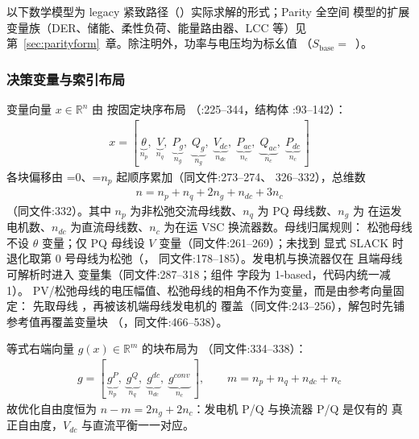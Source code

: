以下数学模型为 legacy 紧致路径（）实际求解的形式；Parity 全空间
模型的扩展变量族（DER、储能、柔性负荷、能量路由器、LCC 等）见
第~\ref{sec:parityform}~章。除注明外，功率与电压均为标幺值
（$S_{\mathrm{base}}=$~）。

\subsubsection*{决策变量与索引布局}
变量向量 $x\in\mathbb{R}^{n}$ 由  按固定块序布局
（:225--344，结构体
:93--142）：
\begin{align*}
x = \left[\,
\underbrace{\theta}_{n_p},\;
\underbrace{V}_{n_q},\;
\underbrace{P_g}_{n_g},\;
\underbrace{Q_g}_{n_g},\;
\underbrace{V_{dc}}_{n_{dc}},\;
\underbrace{P_{ac}}_{n_c},\;
\underbrace{Q_{ac}}_{n_c},\;
\underbrace{P_{dc}}_{n_c}
\,\right]
\end{align*}
各块偏移由 =0、=$n_p$ 起顺序累加（同文件:273--274、
326--332），总维数
\begin{align*}
n = n_p + n_q + 2n_g + n_{dc} + 3n_c
\end{align*}
（同文件:332）。其中 $n_p$ 为非松弛交流母线数、$n_q$ 为 PQ 母线数、$n_g$ 为
在运发电机数、$n_{dc}$ 为直流母线数、$n_c$ 为在运 VSC 换流器数。母线归属规则：
松弛母线不设 $\theta$ 变量；仅 PQ 母线设 $V$ 变量（同文件:261--269）；未找到
显式 SLACK 时退化取第 0 号母线为松弛（，
同文件:178--185）。发电机与换流器仅在  且端母线可解析时进入
变量集（同文件:287--318；组件  字段为 1-based，代码内统一减 1）。
PV/松弛母线的电压幅值、松弛母线的相角不作为变量，而是由参考向量固定：
 先取母线 ，再被该机端母线发电机的
 覆盖（同文件:243--256），解包时先铺参考值再覆盖变量块
（，同文件:466--538）。

等式右端向量 $g(x)\in\mathbb{R}^{m}$ 的块布局为
（同文件:334--338）：
\begin{align*}
g = \left[\,
\underbrace{g^{P}}_{n_p},\;
\underbrace{g^{Q}}_{n_q},\;
\underbrace{g^{dc}}_{n_{dc}},\;
\underbrace{g^{conv}}_{n_c}
\,\right],\qquad
m = n_p + n_q + n_{dc} + n_c
\end{align*}
故优化自由度恒为 $n-m = 2n_g + 2n_c$：发电机 P/Q 与换流器 P/Q 是仅有的
真正自由度，$V_{dc}$ 与直流平衡一一对应。

